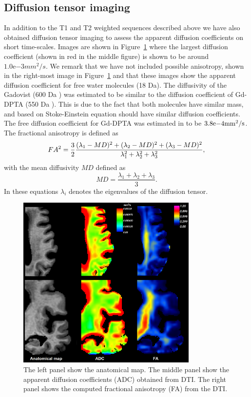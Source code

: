 \documentclass[11pt,a4paper]{article}
\begin{document}
\subsection{Diffusion tensor imaging}
In addition to the T1 and T2 weighted sequences described above we have also obtained diffusion tensor imaging to assess the apparent diffusion 
coefficients on short time-scales. Images are shown in Figure~\ref{figuredti} where the largest diffusion coefficient (shown in 
red in the middle figure) is shown to be around $1.0\mathrm{e}{-3} mm^2/s$. We remark that we have not included possible anisotropy, shown in 
the right-most image in Figure~\ref{figuredti} and that these images show the apparent diffusion coefficient for free water molecules (18 Da).      
The diffusivity of the Gadovist (600 Da \cite{MGadobutrol}) was estimated to be similar to the diffusion coefficient of Gd-DPTA (550 Da \cite{MGgDPTA}). This is due to the fact that both molecules have similar mass, and based on Stoke-Einstein equation should have similar diffusion coefficients. The free diffusion coefficient for Gd-DPTA was estimated in \citet{GdDPTA-DIFFUSION} to be $3.8\mathrm{e}{-4}\mathrm{mm\sp{2}/s}$.
The fractional anisotropy is defined as 
\begin{equation}
FA\sp{2} =  \frac{3}{2} \frac{ (\lambda_1 - MD )\sp{2} +(\lambda_2 - MD )\sp{2} +(\lambda_3 - MD )\sp{2}}{\lambda\sp{2}_1 + \lambda\sp{2}_2  +\lambda\sp{2}_3 },
\end{equation}
with the mean diffusivity $MD$ defined as 
\begin{equation}
MD = \frac{\lambda_1 +\lambda_2 +\lambda_3 }{3}.
\end{equation}
In these equations $\lambda_i$ denotes the eigenvalues of the diffusion tensor.
\begin{figure}
\centering
\includegraphics[width=0.80\textwidth]{DTI-zoom.png} 
\caption{The left panel show the anatomical map. The middle panel show the apparent diffusion coefficients (ADC) obtained from DTI. The right panel shows the computed fractional anisotropy (FA) from the DTI.}
\label{figuredti} 
\end{figure}
\end{document}
